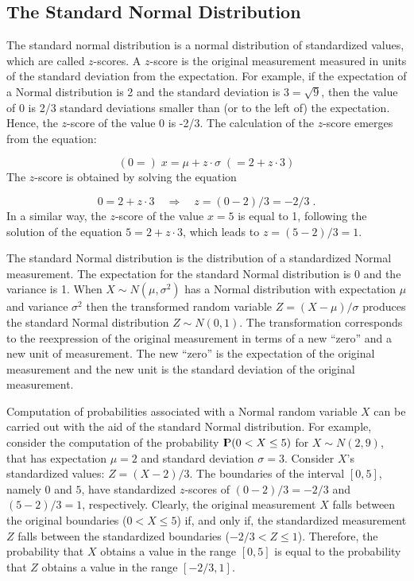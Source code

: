 \documentclass[]{krantz}
\newcommand{\Prob}{{\rm I\kern-.3em P}}
\theoremstyle{definition}
\theoremstyle{definition}
\theoremstyle{definition}
\theoremstyle{remark}
\begin{document}
\subsection{The Standard Normal
Distribution}\label{the-standard-normal-distribution}

The standard normal distribution is a normal distribution of
standardized values, which are called \(z\)-scores. A \(z\)-score is the
original measurement measured in units of the standard deviation from
the expectation. For example, if the expectation of a Normal
distribution is 2 and the standard deviation is \(3 = \sqrt{9}\), then
the value of 0 is 2/3 standard deviations smaller than (or to the left
of) the expectation. Hence, the \(z\)-score of the value 0 is -2/3. The
calculation of the \(z\)-score emerges from the equation:

\[(0 =)\; x = \mu + z \cdot \sigma\; (= 2 + z \cdot 3)\] The \(z\)-score
is obtained by solving the equation

\[0 = 2 + z \cdot 3 \quad \Longrightarrow \quad z = (0-2)/3 = -2/3\;.\]
In a similar way, the \(z\)-score of the value \(x = 5\) is equal to 1,
following the solution of the equation \(5 = 2 + z\cdot 3\), which leads
to \(z = (5-2)/3 = 1\).

The standard Normal distribution is the distribution of a standardized
Normal measurement. The expectation for the standard Normal distribution
is 0 and the variance is 1. When \(X \sim N(\mu,\sigma^2)\) has a Normal
distribution with expectation \(\mu\) and variance \(\sigma^2\) then the
transformed random variable \(Z = (X-\mu)/\sigma\) produces the standard
Normal distribution \(Z\sim N(0,1)\). The transformation corresponds to
the reexpression of the original measurement in terms of a new ``zero''
and a new unit of measurement. The new ``zero'' is the expectation of
the original measurement and the new unit is the standard deviation of
the original measurement.

Computation of probabilities associated with a Normal random variable
\(X\) can be carried out with the aid of the standard Normal
distribution. For example, consider the computation of the probability
\(\Prob(0 < X \leq 5)\) for \(X \sim N(2, 9)\), that has expectation
\(\mu=2\) and standard deviation \(\sigma = 3\). Consider \(X\)'s
standardized values: \(Z = (X-2)/3\). The boundaries of the interval
\([0,5]\), namely \(0\) and \(5\), have standardized \(z\)-scores of
\((0-2)/3=-2/3\) and \((5-2)/3 =1\), respectively. Clearly, the original
measurement \(X\) falls between the original boundaries
(\(0 < X \leq 5\)) if, and only if, the standardized measurement \(Z\)
falls between the standardized boundaries (\(-2/3 < Z \leq 1\)).
Therefore, the probability that \(X\) obtains a value in the range
\([0,5]\) is equal to the probability that \(Z\) obtains a value in the
range \([-2/3,1]\).
\end{document}
